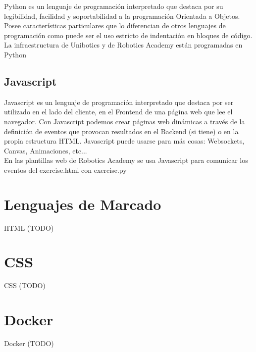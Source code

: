 Python es un lenguaje de programación interpretado que destaca por su legibilidad, facilidad y soportabilidad a la programación Orientada a Objetos. Posee características particulares que lo diferencian de otros lenguajes de programación como puede ser el uso estricto de indentación en bloques de código.\\

La infraestructura de Unibotics y de Robotics Academy están programadas en Python

\subsection{Javascript}
\label{sec:javascript}

Javascript es un lenguaje de programación interpretado que destaca por ser utilizado en el lado del cliente, en el Frontend de una página web que lee el navegador. Con Javascript podemos crear páginas web dinámicas a través de la definición de eventos que provocan resultados en el Backend (si tiene) o en la propia estructura HTML. Javascript puede usarse para más cosas: Websockets, Canvas, Animaciones, etc...\\

En las plantillas web de Robotics Academy se usa Javascript para comunicar los eventos del exercise.html con exercise.py

\section{Lenguajes de Marcado}
\label{sec:html}

HTML (TODO)

\section{CSS}
\label{sec:css}

CSS (TODO)

\section{Docker}
\label{sec:docker}

Docker (TODO)
